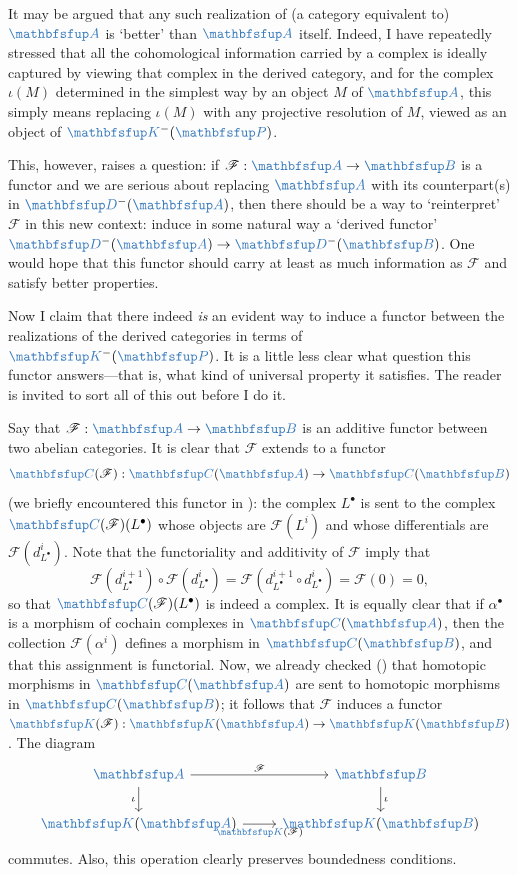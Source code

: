 It may be argued that any such realization of (a category equivalent
to) $\categ{A}$ is `better' than $\categ{A}$ itself. Indeed, I have
repeatedly stressed that all the cohomological information carried by
a complex is ideally captured by viewing that complex in the derived
category, and for the complex $\iota(M)$ determined in the simplest
way by an object $M$ of $\categ{A}$, this simply means replacing
$\iota(M)$ with any projective resolution of $M$, viewed as an object
of $\categ{K}^-(\categ{P})$.

This, however, raises a question: if
$\mathscr{F} : \categ{A} \to \categ{B}$ is a functor and we are
serious about replacing $\categ{A}$ with its counterpart(s) in
$\categ{D}^-(\categ{A})$, then there should be a way to `reinterpret'
$\mathscr{F}$ in this new context: induce in some natural way a
`derived functor' $\categ{D}^-(\categ{A}) \to
\categ{D}^-(\categ{B})$. One would hope that this functor should carry
at least as much information as $\mathscr{F}$ and satisfy better
properties.

Now I claim that there indeed \emph{is} an evident way to induce a
functor between the realizations of the derived categories in terms of
$\categ{K}^-(\categ{P})$. It is a little less clear what question this
functor answers---that is, what kind of universal property it
satisfies. The reader is invited to sort all of this out before I do
it.

Say that $\mathscr{F} : \categ{A} \to \categ{B}$ is an additive
functor between two abelian categories. It is clear that $\mathscr{F}$
extends to a functor
\[
  \categ{C}(\mathscr{F}) : \categ{C}(\categ{A}) \to
  \categ{C}(\categ{B})
\]
(we briefly encountered this functor in
): the complex $L^\bullet$ is
sent to the complex $\categ{C}(\mathscr{F})(L^\bullet)$ whose objects
are $\mathscr{F}(L^i)$ and whose differentials are
$\mathscr{F}(d^i_{L^\bullet})$. Note that the functoriality and
additivity of $\mathscr{F}$ imply that
\[
  \mathscr{F}(d^{i+1}_{L^\bullet}) \circ \mathscr{F}(d^i_{L^\bullet})
  = \mathscr{F}(d^{i+1}_{L^\bullet} \circ d^i_{L^\bullet}) =
  \mathscr{F}(0) = 0,
\]
so that $\categ{C}(\mathscr{F})(L^\bullet)$ is indeed a complex. It is
equally clear that if $\alpha^\bullet$ is a morphism of cochain
complexes in $\categ{C}(\categ{A})$, then the collection
$\mathscr{F}(\alpha^i)$ defines a morphism in $\categ{C}(\categ{B})$,
and that this assignment is functorial. Now, we already checked
() that homotopic morphisms in $\categ{C}(\categ{A})$
are sent to homotopic morphisms in $\categ{C}(\categ{B})$; it follows
that $\mathscr{F}$ induces a functor
$\categ{K}(\mathscr{F}) : \categ{K}(\categ{A}) \to
\categ{K}(\categ{B})$. The diagram
\[\begin{tikzcd}
    \categ{A} \arrow[r, "\mathscr{F}"] \arrow[d, "\iota"'] &
    \categ{B} \arrow[d, "\iota"] \\
    \categ{K}(\categ{A}) \arrow[r, "\categ{K}(\mathscr{F})"'] &
    \categ{K}(\categ{B})
  \end{tikzcd}\] commutes. Also, this operation clearly preserves
boundedness conditions.

